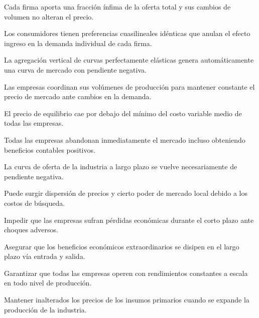 \begin{opts}
    \item Cada firma aporta una fracción ínfima de la oferta total y sus cambios de volumen no alteran el precio.
    \item Los consumidores tienen preferencias cuasilineales idénticas que anulan el efecto ingreso en la demanda individual de cada firma.
    \item La agregación vertical de curvas perfectamente elásticas genera automáticamente una curva de mercado con pendiente negativa.
    \item Las empresas coordinan sus volúmenes de producción para mantener constante el precio de mercado ante cambios en la demanda.
\end{opts}

\begin{opts}
    \item El precio de equilibrio cae por debajo del mínimo del costo variable medio de todas las empresas.
    \item Todas las empresas abandonan inmediatamente el mercado incluso obteniendo beneficios contables positivos.
    \item La curva de oferta de la industria a largo plazo se vuelve necesariamente de pendiente negativa.
    \item Puede surgir dispersión de precios y cierto poder de mercado local debido a los costos de búsqueda.
\end{opts}

\begin{opts}
    \item Impedir que las empresas sufran pérdidas económicas durante el corto plazo ante choques adversos.
    \item Asegurar que los beneficios económicos extraordinarios se disipen en el largo plazo vía entrada y salida.
    \item Garantizar que todas las empresas operen con rendimientos constantes a escala en todo nivel de producción.
    \item Mantener inalterados los precios de los insumos primarios cuando se expande la producción de la industria.
\end{opts}

